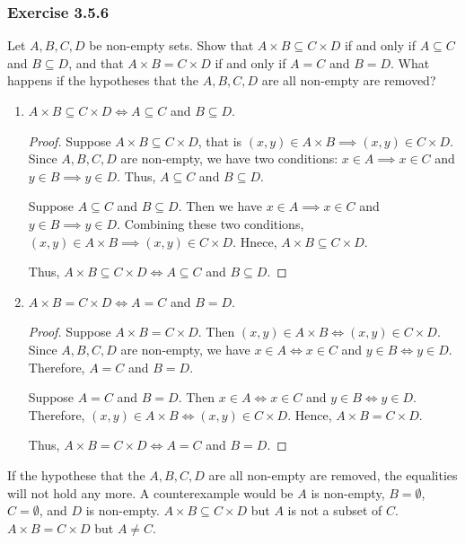\documentclass[12pt, letter]{article}
\begin{document}
\subsubsection*{Exercise 3.5.6}
Let $A,B,C,D$ be non-empty sets. Show that $A\times B\subseteq C\times D$ if and only if $A\subseteq C$ and $B\subseteq D$, and that $A\times B=C\times D$ if and only if $A=C$ and $B=D$. 
What happens if the hypotheses that the $A,B,C,D$ are all non-empty are removed?
\begin{enumerate}
    \item $A\times B\subseteq C\times D\iff A\subseteq C$ and $B\subseteq D$.
    \begin{proof}
        Suppose $A\times B\subseteq C\times D$, that is $(x,y)\in A\times B\implies (x,y)\in C\times D$. Since $A,B,C,D$ are non-empty, we have two conditions: $x\in A\implies x\in C$ and
        $y\in B\implies y\in D$. Thus, $A\subseteq C$ and $B\subseteq D$.

        Suppose $A\subseteq C$ and $B\subseteq D$. Then we have $x\in A\implies x\in C$ and $y\in B\implies y\in D$. Combining these two conditions, $(x,y)\in A\times B\implies (x,y)\in C\times D$.
        Hnece, $A\times B\subseteq C\times D$.

        Thus, $A\times B\subseteq C\times D\iff A\subseteq C$ and $B\subseteq D$.
    \end{proof}
    \item $A\times B=C\times D\iff A=C$ and $B=D$.
    \begin{proof}
        Suppose $A\times B=C\times D$. Then $(x,y)\in A\times B\iff (x,y)\in C\times D$. Since $A,B,C,D$ are non-empty, we have $x\in A\iff x\in C$ and 
        $y\in B\iff y\in D$. Therefore, $A=C$ and $B=D$.

        Suppose $A=C$ and $B=D$. Then $x\in A\iff x\in C$ and $y\in B\iff y\in D$. Therefore, $(x,y)\in A\times B\iff (x,y)\in C\times D$. Hence, $A\times B=C\times D$.

        Thus, $A\times B=C\times D\iff A=C$ and $B=D$.
    \end{proof}
\end{enumerate}
If the hypothese that the $A,B,C,D$ are all non-empty are removed, the equalities will not hold any more. A counterexample would be $A$ is non-empty, $B=\emptyset$, $C=\emptyset$, and $D$ is non-empty. 
$A\times B\subseteq C\times D$ but $A$ is not a subset of $C$. $A\times B=C\times D$ but $A\ne C$.
\end{document}
